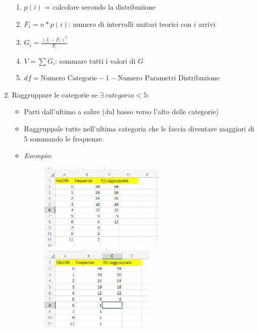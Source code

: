 \begin{enumerate}
\begin{enumerate}
              \item $p(i)$ = calcolare secondo la distribuzione %
              \item $F_i = n * p(i)$: numero di intervalli unitari teorici
                    con $i$ arrivi
              \item $G_i = \frac{(f_i - F_i)^2}{F_i}$
              \item $V = \sum G_i$: sommare tutti i valori di $G$
              \item $df = \text{Numero Categorie} - 1 - \text{Numero
                            Parametri Distribuzione}$
          \end{enumerate}
    \item Raggruppare le categorie se $\exists \ categoria < 5$: %
          \begin{itemize}
              \item Parti dall'ultimo a salire (dal basso verso l'alto delle
                    categorie)
              \item Raggruppale tutte nell'ultima categoria che le faccia
                    diventare maggiori di 5 sommando le frequenze.
              \item \textit{Esempio}:
                    \begin{figure}[H]
                        \centering
                        \includegraphics[width=6cm, keepaspectratio]{capitoli/goodnes_of_fit/imgs/vesceragay.png}
                        \includegraphics[width=5.5cm, keepaspectratio]{capitoli/goodnes_of_fit/imgs/POSTAMOLTOGAY.png}
                    \end{figure}
          \end{itemize}


\end{enumerate}